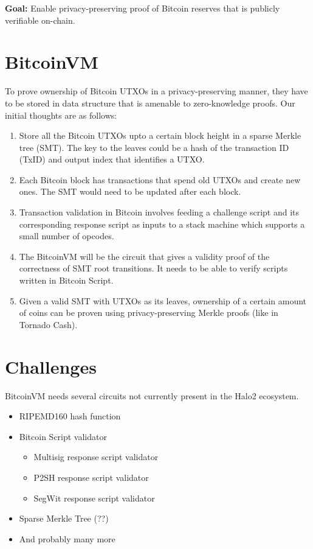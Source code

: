 \documentclass[10pt]{article}
\begin{document}
\textbf{Goal:} Enable privacy-preserving proof of Bitcoin reserves that is publicly verifiable on-chain. 

\section{BitcoinVM}%
\label{sec:bitcoinvm}
To prove ownership of Bitcoin UTXOs in a privacy-preserving manner, they have to be stored in data structure that is amenable to zero-knowledge proofs. Our initial thoughts are as follows:
\begin{enumerate}
  \item Store all the Bitcoin UTXOs upto a certain block height in a sparse Merkle tree (SMT). The key to the leaves could be a hash of the transaction ID (TxID) and output index that identifies a UTXO.
  \item Each Bitcoin block has transactions that spend old UTXOs and create new ones. The SMT would need to be updated after each block.
  \item Transaction validation in Bitcoin involves feeding a challenge script and its corresponding response script as inputs to a stack machine which supports a small number of opcodes. 
  \item The BitcoinVM will be the circuit that gives a validity proof of the correctness of SMT root transitions. It needs to be able to verify scripts written in Bitcoin Script. 
  \item Given a valid SMT with UTXOs as its leaves, ownership of a certain amount of coins can be proven using privacy-preserving Merkle proofs (like in Tornado Cash).
\end{enumerate}

\section{Challenges}%
\label{sec:challenges}
BitcoinVM needs several circuits not currently present in the Halo2 ecosystem.
\begin{itemize}
  \item RIPEMD160 hash function
  \item Bitcoin Script validator
    \begin{itemize}
      \item Multisig response script validator
      \item P2SH response script validator
      \item SegWit response script validator
    \end{itemize}
  \item Sparse Merkle Tree (??)
  \item And probably many more
\end{itemize}



\newpage


\end{document}
